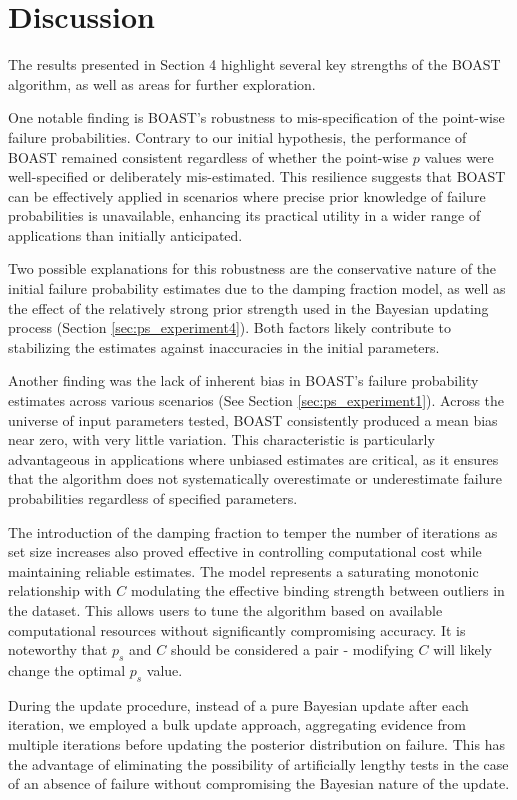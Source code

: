 \section{Discussion}

The results presented in Section 4 highlight several key strengths of the BOAST algorithm, as well as areas for further exploration.

One notable finding is BOAST's robustness to mis-specification of the point-wise failure probabilities. Contrary to our initial hypothesis, the performance of BOAST remained consistent regardless of whether the point-wise $p$ values were well-specified or deliberately mis-estimated. This resilience suggests that BOAST can be effectively applied in scenarios where precise prior knowledge of failure probabilities is unavailable, enhancing its practical utility in a wider range of applications than initially anticipated.

Two possible explanations for this robustness are the conservative nature of the initial failure probability estimates due to the damping fraction model, as well as the effect of the relatively strong prior strength used in the Bayesian updating process (Section \ref{sec:ps_experiment4}). Both factors likely contribute to stabilizing the estimates against inaccuracies in the initial parameters.

Another finding was the lack of inherent bias in BOAST's failure probability estimates across various scenarios (See Section \ref{sec:ps_experiment1}). Across the universe of input parameters tested, BOAST consistently produced a mean bias near zero, with very little variation. This characteristic is particularly advantageous in applications where unbiased estimates are critical, as it ensures that the algorithm does not systematically overestimate or underestimate failure probabilities regardless of specified parameters.

The introduction of the damping fraction to temper the number of iterations as set size increases also proved effective in controlling computational cost while maintaining reliable estimates. The model represents a saturating monotonic relationship with $C$ modulating the effective binding strength between outliers in the dataset. This allows users to tune the algorithm based on available computational resources without significantly compromising accuracy. It is noteworthy that $p_s$ and $C$ should be considered a pair - modifying $C$ will likely change the optimal $p_s$ value.

During the update procedure, instead of a pure Bayesian update after each iteration, we employed a bulk update approach, aggregating evidence from multiple iterations before updating the posterior distribution on failure. This has the advantage of eliminating the possibility of artificially lengthy tests in the case of an absence of failure without compromising the Bayesian nature of the update. 

